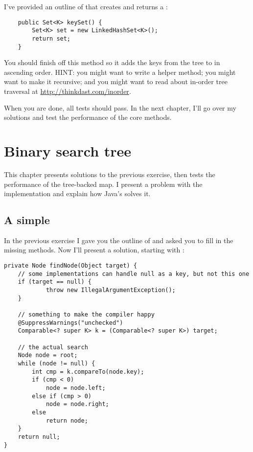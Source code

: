 \documentclass[12pt]{book}
\theoremstyle{exercise}
\begin{document}
I've provided an outline of  that creates and returns a
:

\begin{verbatim}
    public Set<K> keySet() {
        Set<K> set = new LinkedHashSet<K>();
        return set;
    }
\end{verbatim}


You should finish off this method so it adds the keys from the tree to
 in ascending order. HINT: you might want to write a helper
method; you might want to make it recursive; and you might want to
read about in-order tree traversal at
\url{http://thinkdast.com/inorder}.



When you are done, all tests should pass. In the next chapter, I'll go
over my solutions and test the performance of the core methods.


\chapter{Binary search tree}

This chapter presents solutions to the previous exercise, then tests the
performance of the tree-backed map. I present a problem with the
implementation and explain how Java's  solves it.


\section{A simple }
\label{our-version-of-mytreemap}

In the previous exercise I gave you the outline of  and
asked you to fill in the missing methods. Now I'll present a
solution, starting with :


\begin{verbatim}
private Node findNode(Object target) {
    // some implementations can handle null as a key, but not this one
    if (target == null) {
            throw new IllegalArgumentException();
    }

    // something to make the compiler happy
    @SuppressWarnings("unchecked")
    Comparable<? super K> k = (Comparable<? super K>) target;

    // the actual search
    Node node = root;
    while (node != null) {
        int cmp = k.compareTo(node.key);
        if (cmp < 0)
            node = node.left;
        else if (cmp > 0)
            node = node.right;
        else
            return node;
    }
    return null;
}
\end{verbatim}
\end{document}
